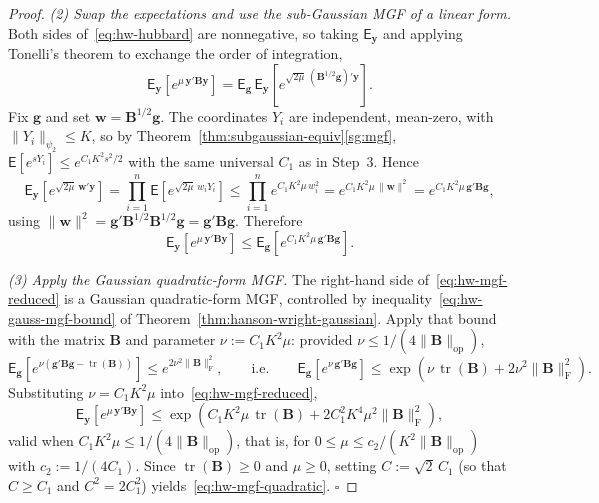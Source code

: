 \documentclass[14pt]{extarticle}
\theoremstyle{plain}
\theoremstyle{definition}
\theoremstyle{remark}
\newcommand\expc{\mathsf{E}}
\DeclareMathOperator\tr{tr}
\newcommand{\by}{\mathbf{y}}
\newcommand{\bw}{\mathbf{w}}
\newcommand{\bB}{\mathbf{B}}
\newcommand{\bg}{\mathbf{g}}
\newcommand{\opnorm}[1]{\|#1\|_{\mathrm{op}}}
\newcommand{\fnorm}[1]{\|#1\|_{\mathrm{F}}}
\begin{document}
\begin{proof}
\emph{(2) Swap the expectations and use the sub-Gaussian MGF of a linear form.} Both sides of~\eqref{eq:hw-hubbard} are nonnegative, so taking $\expc_\by$ and applying Tonelli's theorem to exchange the order of integration,
\[
\expc_\by\!\left[e^{\mu\,\by'\bB\by}\right] = \expc_\bg\,\expc_\by\!\left[e^{\sqrt{2\mu}\,(\bB^{1/2}\bg)'\by}\right].
\]
Fix $\bg$ and set $\bw = \bB^{1/2}\bg$. The coordinates $Y_i$ are independent, mean-zero, with $\|Y_i\|_{\psi_2} \leqslant K$, so by Theorem~\ref{thm:subgaussian-equiv}\ref{sg:mgf}, $\expc[e^{s Y_i}] \leqslant e^{C_1 K^2 s^2/2}$ with the same universal $C_1$ as in Step~3. Hence
\[
\expc_\by\!\left[e^{\sqrt{2\mu}\,\bw'\by}\right] = \prod_{i=1}^n \expc\!\left[e^{\sqrt{2\mu}\,w_i Y_i}\right] \leqslant \prod_{i=1}^n e^{C_1 K^2 \mu\, w_i^2} = e^{C_1 K^2 \mu\,\|\bw\|^2} = e^{C_1 K^2 \mu\,\bg'\bB\bg},
\]
using $\|\bw\|^2 = \bg'\bB^{1/2}\bB^{1/2}\bg = \bg'\bB\bg$. Therefore
\begin{equation}\label{eq:hw-mgf-reduced}
\expc_\by\!\left[e^{\mu\,\by'\bB\by}\right] \leqslant \expc_\bg\!\left[e^{C_1 K^2 \mu\,\bg'\bB\bg}\right].
\end{equation}

\emph{(3) Apply the Gaussian quadratic-form MGF.} The right-hand side of~\eqref{eq:hw-mgf-reduced} is a Gaussian quadratic-form MGF, controlled by inequality~\eqref{eq:hw-gauss-mgf-bound} of Theorem~\ref{thm:hanson-wright-gaussian}. Apply that bound with the matrix $\bB$ and parameter $\nu := C_1 K^2 \mu$: provided $\nu \leqslant 1/(4\opnorm{\bB})$,
\[
\expc_\bg\!\left[e^{\nu(\bg'\bB\bg - \tr(\bB))}\right] \leqslant e^{2\nu^2\fnorm{\bB}^2}, \qquad\text{i.e.}\qquad \expc_\bg\!\left[e^{\nu\,\bg'\bB\bg}\right] \leqslant \exp\!\left(\nu\,\tr(\bB) + 2\nu^2\fnorm{\bB}^2\right).
\]
Substituting $\nu = C_1 K^2\mu$ into~\eqref{eq:hw-mgf-reduced},
\[
\expc_\by\!\left[e^{\mu\,\by'\bB\by}\right] \leqslant \exp\!\left(C_1 K^2\mu\,\tr(\bB) + 2 C_1^2 K^4\mu^2\fnorm{\bB}^2\right),
\]
valid when $C_1 K^2\mu \leqslant 1/(4\opnorm{\bB})$, that is, for $0 \leqslant \mu \leqslant c_2/(K^2\opnorm{\bB})$ with $c_2 := 1/(4C_1)$. Since $\tr(\bB) \geqslant 0$ and $\mu \geqslant 0$, setting $C := \sqrt{2}\,C_1$ (so that $C \geqslant C_1$ and $C^2 = 2C_1^2$) yields~\eqref{eq:hw-mgf-quadratic}. \hfill$\square$


\end{proof}
\end{document}
